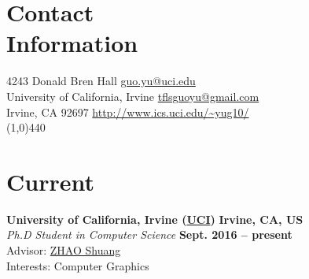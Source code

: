 \documentclass[margin,line]{resume}
\begin{document}
\begin{resume}

    \section{\mysidestyle Contact\\Information}

    4243 Donald Bren Hall                    \hfill \href{mailto:guo.yu@uci.edu}{guo.yu@uci.edu}  \\
    University of California, Irvine                   \hfill \href{mailto:tflsguoyu@gmail.com}{tflsguoyu@gmail.com}\\
    Irvine, CA 92697               \hfill \href{http://www.ics.uci.edu/~yug10/}{\url{http://www.ics.uci.edu/~yug10/}} \\
    
    \vspace{-5.0mm}
    \line(1,0){440}
    \vspace{-5.0mm}

    \section{\mysidestyle Current}

    \textbf{University of California, Irvine (\href{http://www.uci.edu/}{UCI})}       \hfill \textbf{Irvine, CA, US}  \\
    \textsl{Ph.D Student in Computer Science} 															\hfill \textbf{Sept. 2016 -- present} \\
    Advisor: \href{https://shuangz.com/}{ZHAO Shuang} \\
    Interests: Computer Graphics \\



\end{resume}
\end{document}
